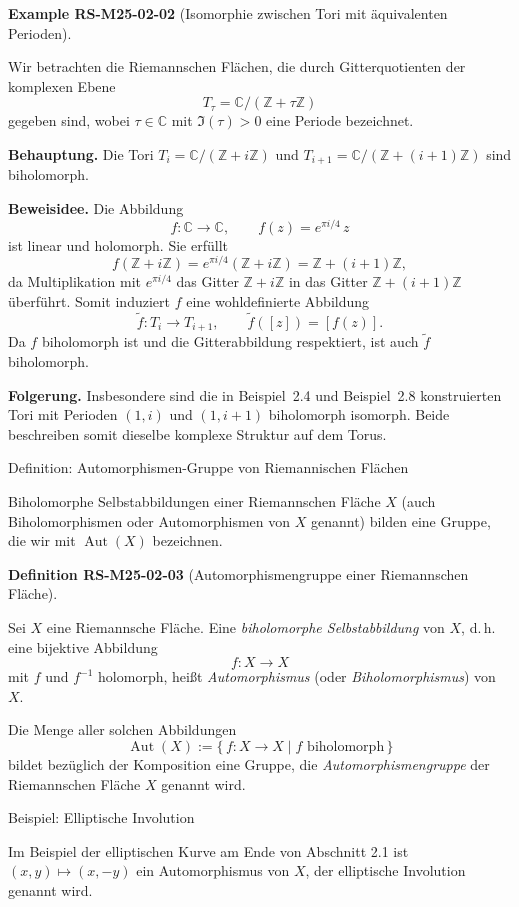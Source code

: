 \documentclass[10pt, letterpaper]{article}
\newcommand{\Z}{\mathbb{Z}}
\newcommand{\C}{\mathbb{C}}
\newcommand{\CustomHeading}[3]{%
  \par\medskip\noindent%
  \textbf{#1 #2} \textnormal{(#3)}.\enskip%
}
\newenvironment{DEF}[2]{\begin{unitbox}\CustomHeading{Definition}{#1}{#2}}{\end{unitbox}}
\newenvironment{EXA}[2]{\begin{unitbox}\CustomHeading{Example}{#1}{#2}}{\end{unitbox}}
\begin{document}
\begin{EXA}{RS-M25-02-02}{Isomorphie zwischen Tori mit äquivalenten Perioden}
Wir betrachten die Riemannschen Flächen, die durch Gitterquotienten der komplexen Ebene
\[
T_{\tau}=\C/(\Z+\tau\Z)
\]
gegeben sind, wobei $\tau\in\C$ mit $\Im(\tau)>0$ eine Periode bezeichnet.

\textbf{Behauptung.}
Die Tori $T_i=\C/(\Z+i\Z)$ und $T_{i+1}=\C/(\Z+(i+1)\Z)$ sind biholomorph.

\textbf{Beweisidee.}
Die Abbildung
\[
f:\C\longrightarrow\C,\qquad f(z)=e^{\pi i/4}\,z
\]
ist linear und holomorph. Sie erfüllt
\[
f(\Z+i\Z)=e^{\pi i/4}(\Z+i\Z)=\Z+(i+1)\Z,
\]
da Multiplikation mit $e^{\pi i/4}$ das Gitter $\Z+i\Z$ in das Gitter $\Z+(i+1)\Z$ überführt. Somit induziert $f$ eine wohldefinierte Abbildung
\[
\tilde{f}:T_i\longrightarrow T_{i+1},\qquad \tilde{f}([z])=[f(z)].
\]
Da $f$ biholomorph ist und die Gitterabbildung respektiert, ist auch $\tilde{f}$ biholomorph.

\textbf{Folgerung.}
Insbesondere sind die in Beispiel~2.4 und Beispiel~2.8 konstruierten Tori mit Perioden $(1,i)$ und $(1,i+1)$ biholomorph isomorph.  
Beide beschreiben somit dieselbe komplexe Struktur auf dem Torus.
\end{EXA}



Definition: Automorphismen-Gruppe von Riemannischen Flächen

Biholomorphe Selbstabbildungen einer Riemannschen Fläche $X$ (auch Biholomorphismen oder Automorphismen von $X$ genannt) bilden eine Gruppe, die wir mit $\operatorname{Aut}(X)$ bezeichnen. 




\begin{DEF}{RS-M25-02-03}{Automorphismengruppe einer Riemannschen Fläche}
Sei $X$ eine Riemannsche Fläche.  
Eine \emph{biholomorphe Selbstabbildung} von $X$, d.\,h. eine bijektive Abbildung
\[
f:X\longrightarrow X
\]
mit $f$ und $f^{-1}$ holomorph, heißt \emph{Automorphismus} (oder \emph{Biholomorphismus}) von $X$.

Die Menge aller solchen Abbildungen
\[
\operatorname{Aut}(X):=\{\,f:X\to X\mid f\text{ biholomorph}\,\}
\]
bildet bezüglich der Komposition eine Gruppe, die \emph{Automorphismengruppe} der Riemannschen Fläche $X$ genannt wird.
\end{DEF}



Beispiel: Elliptische Involution

Im Beispiel der elliptischen Kurve am Ende von Abschnitt 2.1 ist $(x, y) \mapsto(x,-y)$ ein Automorphismus von $X$, der elliptische Involution genannt wird.
\end{document}
